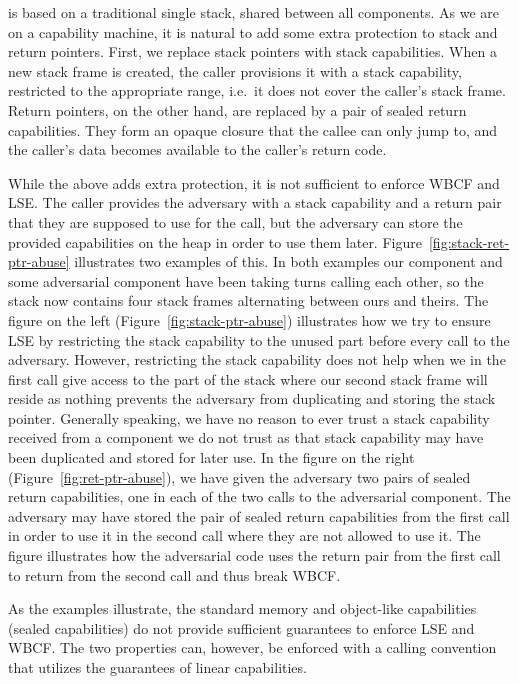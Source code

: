 \documentclass[acmsmall,review,anonymous]{acmart}\settopmatter{printfolios=true,printccs=false,printacmref=false}
\begin{document}
\stktokens{} is based on a traditional single stack, shared between all components.
As we are on a capability machine, it is natural to add some extra protection to stack and return pointers.
First, we replace stack pointers with stack capabilities.
When a new stack frame is created, the caller provisions it with a stack capability, restricted to the appropriate range, i.e.\ it does not cover the caller's stack frame.
Return pointers, on the other hand, are replaced by a pair of sealed return capabilities.
They form an opaque closure that the callee can only jump to, and the caller's data becomes available to the caller's return code. 

While the above adds extra protection, it is not sufficient to enforce WBCF and LSE.
The caller provides the adversary with a stack capability and a return pair that they are supposed to use for the call, but the adversary can store the provided capabilities on the heap in order to use them later.
Figure~\ref{fig:stack-ret-ptr-abuse} illustrates two examples of this.
In both examples our component and some adversarial component have been taking turns calling each other, so the stack now contains four stack frames alternating between ours and theirs.
The figure on the left (Figure~\ref{fig:stack-ptr-abuse}) illustrates how we try to ensure LSE by restricting the stack capability to the unused part before every call to the adversary.
However, restricting the stack capability does not help when we in the first call give access to the part of the stack where our second stack frame will reside as nothing prevents the adversary from duplicating and storing the stack pointer.
Generally speaking, we have no reason to ever trust a stack capability received from a component we do not trust as that stack capability may have been duplicated and stored for later use.
In the figure on the right (Figure~\ref{fig:ret-ptr-abuse}), we have given the adversary two pairs of sealed return capabilities, one in each of the two calls to the adversarial component.
The adversary may have stored the pair of sealed return capabilities from the first call in order to use it in the second call where they are not allowed to use it.
The figure illustrates how the adversarial code uses the return pair from the first call to return from the second call and thus break WBCF.

As the examples illustrate, the standard memory and object-like capabilities (sealed capabilities) do not provide sufficient guarantees to enforce LSE and WBCF.
The two properties can, however, be enforced with a calling convention that utilizes the guarantees of linear capabilities.
\end{document}
